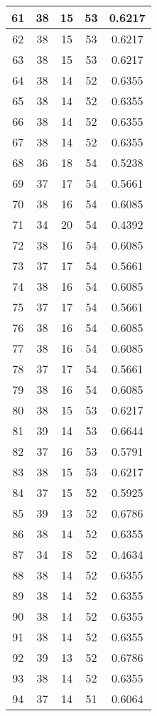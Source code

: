\documentclass[letterpaper, 12pt]{article}
\begin{document}
\begin{longtable}{|c|c|c|c|c|}
\hline
61 & 38 & 15 & 53 & 0.6217 \\
\hline
62 & 38 & 15 & 53 & 0.6217 \\
\hline
63 & 38 & 15 & 53 & 0.6217 \\
\hline
64 & 38 & 14 & 52 & 0.6355 \\
\hline
65 & 38 & 14 & 52 & 0.6355 \\
\hline
66 & 38 & 14 & 52 & 0.6355 \\
\hline
67 & 38 & 14 & 52 & 0.6355 \\
\hline
68 & 36 & 18 & 54 & 0.5238 \\
\hline
69 & 37 & 17 & 54 & 0.5661 \\
\hline
70 & 38 & 16 & 54 & 0.6085 \\
\hline
71 & 34 & 20 & 54 & 0.4392 \\
\hline
72 & 38 & 16 & 54 & 0.6085 \\
\hline
73 & 37 & 17 & 54 & 0.5661 \\
\hline
74 & 38 & 16 & 54 & 0.6085 \\
\hline
75 & 37 & 17 & 54 & 0.5661 \\
\hline
76 & 38 & 16 & 54 & 0.6085 \\
\hline
77 & 38 & 16 & 54 & 0.6085 \\
\hline
78 & 37 & 17 & 54 & 0.5661 \\
\hline
79 & 38 & 16 & 54 & 0.6085 \\
\hline
80 & 38 & 15 & 53 & 0.6217 \\
\hline
81 & 39 & 14 & 53 & 0.6644 \\
\hline
82 & 37 & 16 & 53 & 0.5791 \\
\hline
83 & 38 & 15 & 53 & 0.6217 \\
\hline
84 & 37 & 15 & 52 & 0.5925 \\
\hline
85 & 39 & 13 & 52 & 0.6786 \\
\hline
86 & 38 & 14 & 52 & 0.6355 \\
\hline
87 & 34 & 18 & 52 & 0.4634 \\
\hline
88 & 38 & 14 & 52 & 0.6355 \\
\hline
89 & 38 & 14 & 52 & 0.6355 \\
\hline
90 & 38 & 14 & 52 & 0.6355 \\
\hline
91 & 38 & 14 & 52 & 0.6355 \\
\hline
92 & 39 & 13 & 52 & 0.6786 \\
\hline
93 & 38 & 14 & 52 & 0.6355 \\
\hline
94 & 37 & 14 & 51 & 0.6064 \\

\end{longtable}
\end{document}
